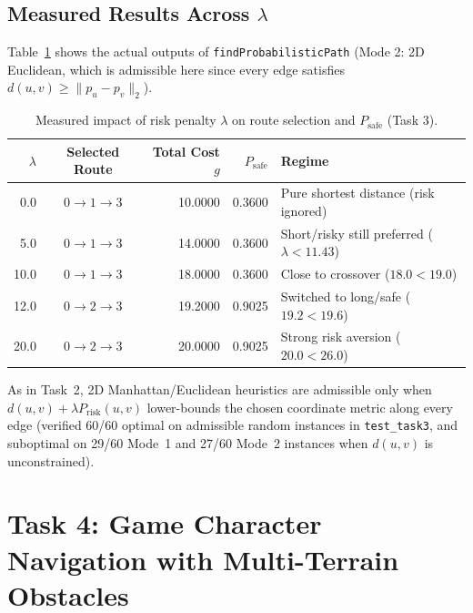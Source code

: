 \documentclass[11pt,a4paper]{article}
\begin{document}
\subsection{Measured Results Across $\lambda$}
Table~\ref{tab:task3-lambda} shows the actual outputs of \texttt{findProbabilisticPath} (Mode 2: 2D Euclidean, which is admissible here since every edge satisfies $d(u,v) \ge \|p_u - p_v\|_2$).

\begin{table}[h]
\centering
\caption{Measured impact of risk penalty $\lambda$ on route selection and $P_{\text{safe}}$ (Task 3).}
\label{tab:task3-lambda}
\begin{tabular}{@{}r c r r l@{}}
\toprule
$\lambda$ & Selected Route & Total Cost $g$ & $P_{\text{safe}}$ & Regime \\
\midrule
0.0  & $0 \to 1 \to 3$ & 10.0000 & 0.3600 & Pure shortest distance (risk ignored) \\
5.0  & $0 \to 1 \to 3$ & 14.0000 & 0.3600 & Short/risky still preferred ($\lambda < 11.43$) \\
10.0 & $0 \to 1 \to 3$ & 18.0000 & 0.3600 & Close to crossover ($18.0 < 19.0$) \\
12.0 & $0 \to 2 \to 3$ & 19.2000 & 0.9025 & Switched to long/safe ($19.2 < 19.6$) \\
20.0 & $0 \to 2 \to 3$ & 20.0000 & 0.9025 & Strong risk aversion ($20.0 < 26.0$) \\
\bottomrule
\end{tabular}
\end{table}

As in Task~2, 2D Manhattan/Euclidean heuristics are admissible only when $d(u,v) + \lambda P_{\text{risk}}(u,v)$ lower-bounds the chosen coordinate metric along every edge (verified 60/60 optimal on admissible random instances in \texttt{test\_task3}, and suboptimal on 29/60 Mode~1 and 27/60 Mode~2 instances when $d(u,v)$ is unconstrained).

\section{Task 4: Game Character Navigation with Multi-Terrain Obstacles}
\end{document}
